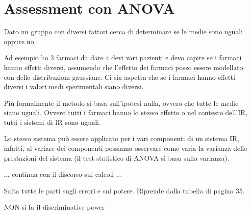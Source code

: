 

\section{Assessment con ANOVA}

Dato un gruppo con diversi fattori cerca di determinare se le medie sono uguali oppure no.

Ad esempio ho 3 farmaci da dare a devi vari pazienti e devo capire se i farmaci hanno effetti diversi, assumendo che l'effetto dei farmaci posso essere modellato con delle distribuzioni gaussiane.
Ci sia aspetta che se i farmaci hanno effetti diversi i valori medi sperimentali siano diversi.

Più formalmente il metodo si basa sull'ipotesi nulla, ovvero che tutte le medie siano uguali. Ovvero tutti i farmaci hanno lo stesso effetto o nel contesto dell'IR, tutti i sistemi di IR sono uguali.

Lo stesso sistema può essere applicato per i vari componenti di un sistema IR, infatti, al variare dei componenti possiamo osservare come varia la varianza delle prestazioni del sistema (il test statistico di ANOVA si basa sulla varianza).

... continua con il discorso sui calcoli ...

Salta tutte le parti sugli errori e sul potere. Riprende dalla tabella di pagina 35.

NON si fa il discriminative power
